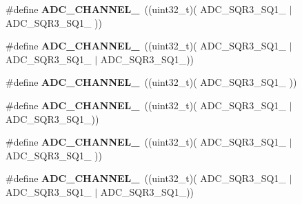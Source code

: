 \begin{DoxyCompactItemize}
\item 
\mbox{\label{group___a_d_c__channels_ga418f0223ea88773157638097391716a5}} 
\#define {\bfseries A\+D\+C\+\_\+\+C\+H\+A\+N\+N\+E\+L\+\_}~((uint32\+\_\+t)(                                  A\+D\+C\+\_\+\+S\+Q\+R3\+\_\+\+S\+Q1\+\_ $\vert$ A\+D\+C\+\_\+\+S\+Q\+R3\+\_\+\+S\+Q1\+\_                 ))
\item 
\mbox{\label{group___a_d_c__channels_ga03b8138c2d87274f94ba675a7e18e666}} 
\#define {\bfseries A\+D\+C\+\_\+\+C\+H\+A\+N\+N\+E\+L\+\_}~((uint32\+\_\+t)(                                  A\+D\+C\+\_\+\+S\+Q\+R3\+\_\+\+S\+Q1\+\_ $\vert$ A\+D\+C\+\_\+\+S\+Q\+R3\+\_\+\+S\+Q1\+\_ $\vert$ A\+D\+C\+\_\+\+S\+Q\+R3\+\_\+\+S\+Q1\+\_))
\item 
\mbox{\label{group___a_d_c__channels_gab0917f6b66213f33f2e2ea8781df5aa9}} 
\#define {\bfseries A\+D\+C\+\_\+\+C\+H\+A\+N\+N\+E\+L\+\_}~((uint32\+\_\+t)(                 A\+D\+C\+\_\+\+S\+Q\+R3\+\_\+\+S\+Q1\+\_                                                   ))
\item 
\mbox{\label{group___a_d_c__channels_ga95f485ecc05187c3d475238a88beef1c}} 
\#define {\bfseries A\+D\+C\+\_\+\+C\+H\+A\+N\+N\+E\+L\+\_}~((uint32\+\_\+t)(                 A\+D\+C\+\_\+\+S\+Q\+R3\+\_\+\+S\+Q1\+\_                                   $\vert$ A\+D\+C\+\_\+\+S\+Q\+R3\+\_\+\+S\+Q1\+\_))
\item 
\mbox{\label{group___a_d_c__channels_gaa55df8c97225d32b495959896897567c}} 
\#define {\bfseries A\+D\+C\+\_\+\+C\+H\+A\+N\+N\+E\+L\+\_}~((uint32\+\_\+t)(                 A\+D\+C\+\_\+\+S\+Q\+R3\+\_\+\+S\+Q1\+\_                  $\vert$ A\+D\+C\+\_\+\+S\+Q\+R3\+\_\+\+S\+Q1\+\_                 ))
\item 
\mbox{\label{group___a_d_c__channels_gaf36361a33c07b04f8ab1d58d232bc434}} 
\#define {\bfseries A\+D\+C\+\_\+\+C\+H\+A\+N\+N\+E\+L\+\_}~((uint32\+\_\+t)(                 A\+D\+C\+\_\+\+S\+Q\+R3\+\_\+\+S\+Q1\+\_                  $\vert$ A\+D\+C\+\_\+\+S\+Q\+R3\+\_\+\+S\+Q1\+\_ $\vert$ A\+D\+C\+\_\+\+S\+Q\+R3\+\_\+\+S\+Q1\+\_))
\item 

\end{DoxyCompactItemize}
